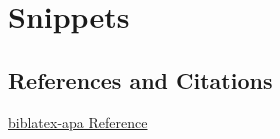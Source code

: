 \chapter{Snippets}

\section{References and Citations}

\href{https://ctan.org/pkg/biblatex-apa}{biblatex-apa Reference}

\textcite{ARRI2012a}

\textcite{ARRI2012a,Barlow1964}

\parencite{ARRI2012a}

\parencite{ARRI2012a,Barlow1964}
